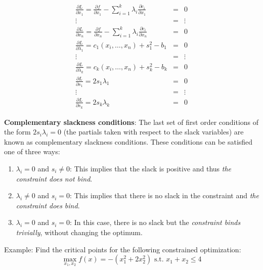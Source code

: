 \documentclass[]{book}
\theoremstyle{definition}
\theoremstyle{definition}
\theoremstyle{definition}
\theoremstyle{remark}
\begin{document}
\begin{eqnarray*}
\frac{\partial L}{\partial x_1} = \frac{\partial f}{\partial x_1} - \sum_{i = 1}^k\lambda_i\frac{\partial c_i}{\partial x_1} & = & 0\\
 \vdots & = & \vdots \nonumber \\
\frac{\partial L}{\partial x_n}  = \frac{\partial f}{\partial x_n} - \sum_{i = 1}^k\lambda_i\frac{\partial c_i}{\partial x_n} & =  & 0\\
\frac{\partial L}{\partial \lambda_1} = c_1(x_i, \dots, x_n) + s_1^2 - b_1& = & 0\\
 \vdots & = & \vdots \nonumber \\
\frac{\partial L}{\partial \lambda_k} = c_k(x_i, \dots, x_n) + s_k^2 - b_k & = & 0\\
\frac{\partial L}{\partial s_1} = 2s_1\lambda_1 & = & 0\\
 \vdots & = & \vdots \nonumber \\
\frac{\partial L}{\partial s_k} = 2s_k\lambda_k & = & 0
\end{eqnarray*}

\textbf{Complementary slackness conditions}: The last set of first order
conditions of the form \(2s_i\lambda_i = 0\) (the partials taken with
respect to the slack variables) are known as complementary slackness
conditions. These conditions can be satisfied one of three ways:

\begin{enumerate}
\item $\lambda_i = 0$ and $s_i \neq 0$: This implies that the slack is positive and thus \textit{the constraint does not bind}.
\item $\lambda_i \neq 0$ and $s_i = 0$: This implies that there is no slack in the constraint and \textit{the constraint does bind}.
\item $\lambda_i = 0$ and $s_i = 0$: In this case, there is no slack but the \textit{constraint binds trivially}, without changing the optimum.\\
\end{enumerate}

Example: Find the critical points for the following constrained
optimization:
\[\max_{x_1,x_2} f(x) = -(x_1^2 + 2x_2^2) \text{ s.t. } x_1 + x_2 \le 4\]
\end{document}
